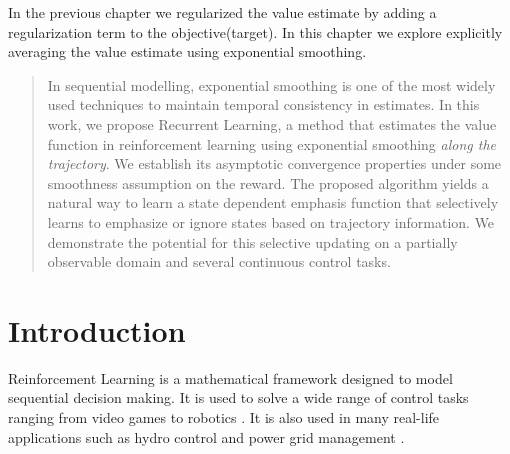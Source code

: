 
In the previous chapter we regularized the value estimate by adding a regularization term to the objective(target). In this chapter we explore explicitly averaging the value estimate using exponential smoothing.

\begin{abstract}

In sequential modelling, exponential smoothing is one of the most widely used techniques to maintain temporal consistency in estimates. In this work, we propose Recurrent Learning, a method that estimates the value function in reinforcement learning using exponential smoothing \emph{along the trajectory}. We establish its asymptotic convergence properties under some smoothness assumption on the reward.  The proposed algorithm yields a natural way to learn a state dependent emphasis function that selectively learns to emphasize or ignore states based on trajectory information. We demonstrate the potential for this selective updating on a partially observable domain and several continuous control tasks.

\end{abstract}

\section{Introduction}
Reinforcement Learning is a mathematical framework designed to model sequential decision making. It is used to solve a wide range of control tasks ranging from video games \cite{vinyals2017starcraft,mnih2013playing,mnih2016asynchronous} to robotics \cite{kober2013reinforcement,abbeel2010autonomous}. It is also used in many real-life applications such as hydro control \cite{grinberg2014optimizing} and power grid management \cite{franccois2016deep}.

